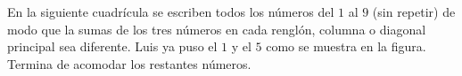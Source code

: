 En la siguiente cuadrícula se escriben todos los números del $1$ al $9$ (sin repetir) de modo que la sumas de los tres números en cada renglón, columna o diagonal principal sea diferente. Luis ya puso el $1$ y el $5$ como se muestra en la figura. Termina de acomodar los restantes números.
